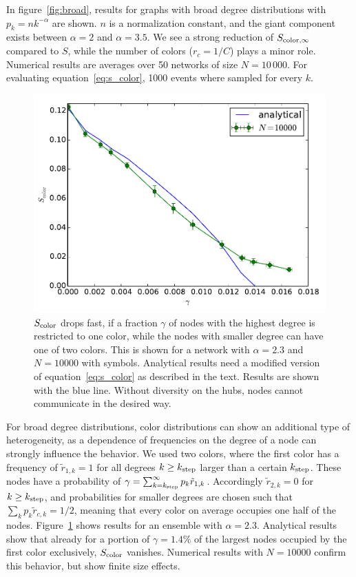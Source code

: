 \documentclass[aps, pre, onecolumn, a4paper, floatfix]{revtex4}
\begin{document}
In figure~\ref{fig:broad}, results for graphs with broad degree distributions with 
$p_k=n k^{-\alpha}$ are shown. $n$ is a normalization constant, and the giant component 
exists between $\alpha=2$ and $\alpha=3.5$. We see a strong reduction of 
$S_{{\rm color},\infty}$ compared to $S$, while the number of colors ($r_c=1/C$) plays 
a minor role. Numerical results are averages over 50 networks of size $N=10\,000$. 
For evaluating equation~\ref{eq:s_color}, 1000 events where sampled for every $k$. 


\begin{figure}[htb]
\begin{center}
	\includegraphics[width=0.6\columnwidth]{S_color_degree_dependent.pdf}
	\caption{$S_{\rm color}$ drops fast, if a fraction $\gamma$ of nodes with the highest 
	degree is restricted to one color, while the nodes with smaller degree can have one of 
	two colors. This is shown for a network with $\alpha=2.3$ and $N=10000$ with symbols. 
	Analytical results need a modified version of equation~\ref{eq:s_color} as described 
	in the text. Results are shown with the blue line. 	Without diversity 
	on the hubs, nodes cannot communicate in the desired way.}
	\label{fig:degree}
\end{center}
\end{figure}

For broad degree distributions, color distributions can show an additional type of 
heterogeneity, as a dependence of frequencies on the degree of a node can strongly 
influence the behavior. We used two colors, where the first color has a frequency 
of ${\tilde r}_{1,k}=1$ for all degrees $k\geq k_{\rm step}$ larger than a certain 
$k_{\rm step}$. These nodes have a probability of 
$\gamma=\sum_{k=k_{\rm step}}^{\infty} p_k {\tilde r}_{1,k}$. Accordingly 
${\tilde r}_{2,k}=0$ for $k\geq k_{\rm step}$, and probabilities for smaller degrees are chosen such 
that $\sum_k p_k {\tilde r}_{c,k}=1/2$, meaning that every color on average occupies one 
half of the nodes. Figure~\ref{fig:degree} shows results for an ensemble with 
$\alpha=2.3$. Analytical results show that already for a portion of $\gamma=1.4\%$
of the largest nodes occupied by the first color exclusively, $S_{\rm color}$ vanishes. 
Numerical results with $N=10000$ confirm this behavior, but show finite size effects. 
\end{document}

